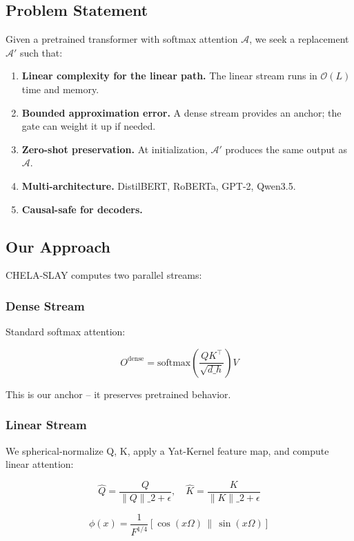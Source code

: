 \subsection{Problem Statement}

Given a pretrained transformer with softmax attention $\mathcal{A}$, we seek 
a replacement $\mathcal{A}'$ such that:

\begin{enumerate}
\item \textbf{Linear complexity for the linear path.} The linear stream runs in
  $\mathcal{O}(L)$ time and memory.
\item \textbf{Bounded approximation error.} A dense stream provides an anchor; the
  gate can weight it up if needed.
\item \textbf{Zero-shot preservation.} At initialization, $\mathcal{A}'$ produces
  the same output as $\mathcal{A}$.
\item \textbf{Multi-architecture.} DistilBERT, RoBERTa, GPT-2, Qwen3.5.
\item \textbf{Causal-safe for decoders.}

\end{enumerate}
\subsection{Our Approach}

CHELA-SLAY computes two parallel streams:

\subsubsection{Dense Stream}

Standard softmax attention:

\[
O^\text{dense} = \text{softmax}\!\left(\frac{Q K^\top}{\sqrt{d\_h}}\right) V
\]

This is our anchor -- it preserves pretrained behavior.

\subsubsection{Linear Stream}

We spherical-normalize Q, K, apply a Yat-Kernel feature map, and compute 
linear attention:

\[
\hat{Q} = \frac{Q}{\|Q\|\_2 + \epsilon}, \quad
\hat{K} = \frac{K}{\|K\|\_2 + \epsilon}
\]

\[
\phi(x) = \frac{1}{F^{1/4}} [\cos(x \Omega) \,\|\, \sin(x \Omega)]
\]

